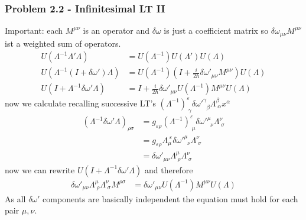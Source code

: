 \documentclass[10pt,a4paper]{article}
\theoremstyle{definition}
\begin{document}
\subsubsection{Problem 2.2 - Infinitesimal LT II}
Important: each $M^{\mu\nu}$ is an operator and $\delta\omega$ is just a coefficient matrix so $\delta\omega _{\mu\nu}M^{\mu\nu}$ ist a weighted sum of operators.
\begin{align}
U(\Lambda^{-1}\Lambda'\Lambda)&=U(\Lambda^{-1})U(\Lambda')U(\Lambda)\\
U(\Lambda^{-1}(I+\delta\omega')\Lambda)&=U(\Lambda^{-1})\left(I+\frac{i}{2\hbar}\delta\omega'_{\mu\nu}M^{\mu\nu}\right)U(\Lambda)\\
U(I+\Lambda^{-1}\delta\omega'\Lambda)&=I+\frac{i}{2\hbar}\delta\omega'_{\mu\nu}U(\Lambda^{-1})M^{\mu\nu}U(\Lambda)
\end{align}
now we calculate recalling successive LT's $(\Lambda^{-1})^{\varepsilon}_{\;\gamma}\delta\omega'^\gamma_{\;\;\beta}\Lambda^\beta_{\;\alpha}x^\alpha$
\begin{align}
(\Lambda^{-1}\delta\omega'\Lambda)_{\rho\sigma}
&=g_{\varepsilon\rho}(\Lambda^{-1})^{\varepsilon}_{\;\mu}\delta\omega'^\mu_{\;\;\nu}\Lambda^\nu_{\;\sigma}\\
&=g_{\varepsilon\rho}\Lambda^{\;\varepsilon}_{\mu}\delta\omega'^\mu_{\;\;\nu}\Lambda^\nu_{\;\sigma}\\
&=\delta\omega'_{\mu\nu}\Lambda^{\mu}_{\;\rho}\Lambda^\nu_{\;\sigma}
\end{align}
now we can rewrite $U(I+\Lambda^{-1}\delta\omega'\Lambda)$ and therefore
\begin{align}
\delta\omega'_{\mu\nu}\Lambda^{\mu}_{\;\rho}\Lambda^\nu_{\;\sigma}M^{\rho\sigma}&=\delta\omega'_{\mu\nu}U(\Lambda^{-1})M^{\mu\nu}U(\Lambda)
\end{align}
As all $\delta\omega'$ components are basically independent the equation must hold for each pair $\mu,\nu$.
\end{document}
